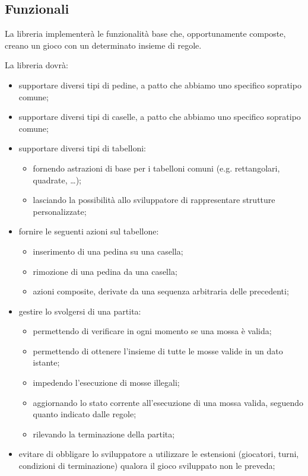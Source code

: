 \subsection{Funzionali}

La libreria implementerà le funzionalità base che, opportunamente composte, creano un gioco con un determinato insieme di regole.

La libreria dovrà:
%
\begin{itemize}
    \item supportare diversi tipi di pedine, a patto che abbiamo uno specifico sopratipo comune;
    \item supportare diversi tipi di caselle, a patto che abbiamo uno specifico sopratipo comune;
    \item supportare diversi tipi di tabelloni:
    \begin{itemize}
        \item fornendo astrazioni di base per i tabelloni comuni (e.g. rettangolari, quadrate, \dots);
        \item lasciando la possibilità allo sviluppatore di rappresentare strutture personalizzate;
    \end{itemize}
    \item fornire le seguenti azioni sul tabellone:
    \begin{itemize}
        \item inserimento di una pedina su una casella;
        \item rimozione di una pedina da una casella;
        \item azioni composite, derivate da una sequenza arbitraria delle precedenti;
    \end{itemize}
    \item gestire lo svolgersi di una partita:
    \begin{itemize}
        \item permettendo di verificare in ogni momento se una mossa è valida;
        \item permettendo di ottenere l'insieme di tutte le mosse valide in un dato istante; 
        \item impedendo l'esecuzione di mosse illegali;
        \item aggiornando lo stato corrente all'esecuzione di una mossa valida, seguendo quanto indicato dalle regole;
        \item rilevando la terminazione della partita;
    \end{itemize}
    \item evitare di obbligare lo sviluppatore a utilizzare le estensioni (giocatori, turni, condizioni di terminazione) qualora il gioco sviluppato non le preveda;

\end{itemize}

